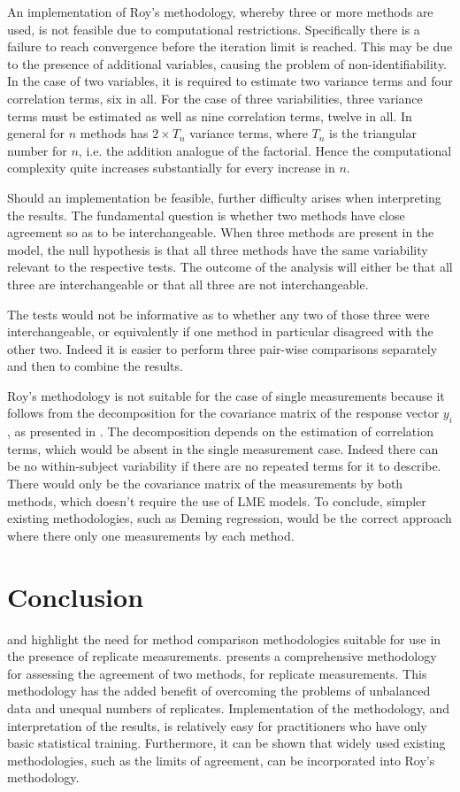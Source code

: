\documentclass[12pt, a4paper]{article}
\theoremstyle{plain}
\theoremstyle{definition}
\theoremstyle{remark}
\begin{document}
An implementation of Roy's methodology, whereby three or more methods are used, is not feasible due to computational restrictions. Specifically there is a failure to reach convergence before the iteration limit is reached. This may be due to the presence of additional variables, causing the problem of non-identifiability. In the case of two variables, it is required to estimate two variance terms and four correlation terms, six in all. For the case of three variabilities, three variance terms must be estimated as well as nine correlation terms, twelve in all. In general for $n$ methods has $2 \times T_{n}$ variance terms, where $T_n$ is the triangular number for $n$, i.e. the addition analogue of the factorial. Hence the computational complexity quite increases substantially for every increase in $n$.

Should an implementation be feasible, further difficulty arises when interpreting the results. The fundamental question is whether two methods have close agreement so as to be interchangeable. When three methods are present in the model, the null hypothesis is that all three methods have the same variability relevant to the respective tests. The outcome of the analysis will either be that all three are interchangeable or that all three are not interchangeable.

The tests would not be informative as to whether any two of those three were interchangeable, or equivalently if one method in particular disagreed with the other two. Indeed it is easier to perform three pair-wise comparisons separately and then to combine the results.

Roy's methodology is not suitable for the case of single measurements because it follows from the decomposition for the covariance matrix of the response vector $y_{i}$, as presented in \citet{hamlett}. The decomposition depends on the estimation of correlation terms, which would be absent in the single measurement case. Indeed there can be no within-subject variability if there are no repeated terms for it to describe. There would only be the covariance matrix of the measurements by both methods, which doesn't require the use of LME models. To conclude, simpler existing methodologies, such as Deming regression, would be the correct approach where there only one measurements by each method.

\section{Conclusion}
\citet{BXC2008} and \citet{roy} highlight the need for method comparison methodologies suitable for use in the presence of replicate measurements. \citet{roy} presents a comprehensive methodology for assessing the agreement of two methods, for replicate measurements. This methodology has the added benefit of overcoming the problems of unbalanced data and unequal numbers of replicates. Implementation of the methodology, and interpretation of the results, is relatively easy for practitioners who have only basic statistical training. Furthermore, it can be shown that widely used existing methodologies, such as the limits of agreement, can be incorporated into Roy's methodology.


\end{document}
